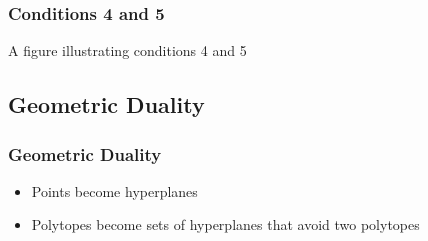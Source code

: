 \documentclass{beamer}
\begin{document}
\frame
{
   \frametitle{Conditions 4 and 5}
   A figure illustrating conditions 4 and 5
}

\subsection{Geometric Duality}
\frame
{ \frametitle{Geometric Duality}
  \begin{itemize}
    \item Points become hyperplanes
    \item Polytopes become sets of hyperplanes that avoid two polytopes
  \end{itemize}
}
\end{document}
